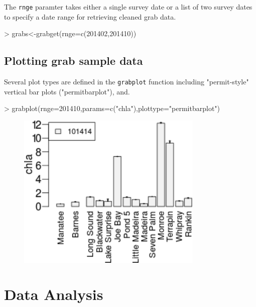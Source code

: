 \documentclass[12pt]{article}
\begin{document}
The \texttt{rnge} paramter takes either a single survey date or a list of two survey dates to specify a date range for retrieving cleaned grab data.

\begin{Schunk}
\begin{Sinput}
> grabs<-grabget(rnge=c(201402,201410))
\end{Sinput}
\end{Schunk}

\subsection{Plotting grab sample data}

Several plot types are defined in the \texttt{grabplot} function including "permit-style" vertical bar plots ("permitbarplot"), and.

\begin{Schunk}
\begin{Sinput}
> grabplot(rnge=201410,params=c("chla"),plottype="permitbarplot")
\end{Sinput}
\end{Schunk}

 \begin{figure}[h!]
 \begin{center}
 \includegraphics[width=3.5in,keepaspectratio=true]{figure1}
 \end{center}
 \label{fig:one}
 \end{figure}

\section{Data Analysis}
\end{document}
